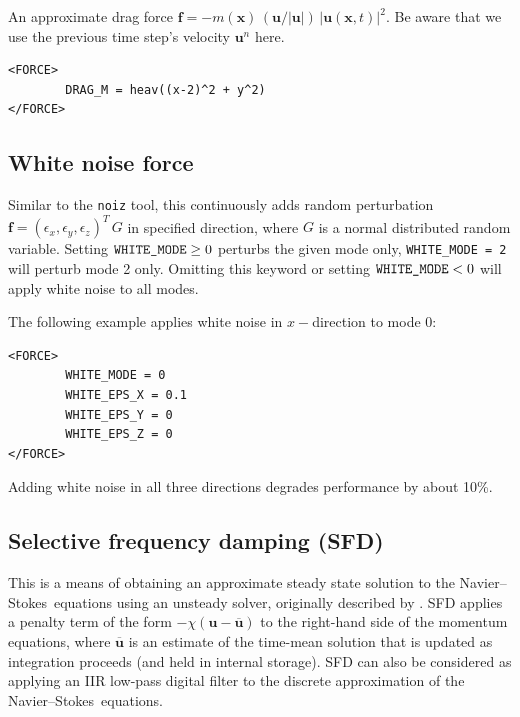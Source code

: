 \documentclass[11pt]{report}
\newcommand\NavSto{Navier--Stokes}
\begin{document}
An approximate drag force
$\bm{f} = - m(\bm{x}) \, (\bm{u}/|\bm{u}|)\, |\bm{u}(\bm{x},
t)|^2$.
Be aware that we use the previous time step's velocity $\bm{u}^{n}$ here.
\begin{verbatim}
<FORCE>
        DRAG_M = heav((x-2)^2 + y^2)
</FORCE>
\end{verbatim}

\subsection{White noise force}

Similar to the \verb+noiz+ tool, this continuously adds random
perturbation $\bm{f} = (\epsilon_x, \epsilon_y, \epsilon_z)^T\,G$ in
specified direction, where $G$ is a normal distributed random
variable. Setting $\verb+WHITE_MODE+ \ge 0$ perturbs the given mode
only, \ie \verb+WHITE_MODE = 2+ will perturb mode 2 only. Omitting
this keyword or setting $\verb+WHITE_MODE+ < 0$ will apply white noise
to all modes.

The following example applies white noise in $x-$direction to mode 0:
\begin{verbatim}
<FORCE>
        WHITE_MODE = 0
        WHITE_EPS_X = 0.1
        WHITE_EPS_Y = 0
        WHITE_EPS_Z = 0
</FORCE>
\end{verbatim}
Adding white noise in all three directions degrades performance by
about 10\%. 

\subsection{Selective frequency damping (SFD)}
\label{sec.sfd}

This is a means of obtaining an approximate steady state solution to
the \NavSto\ equations using an unsteady solver, originally described
by \citet{abhhms06}. SFD applies a penalty term of the form
$-\chi(\bm{u}-\overline{\bm{u}})$ to the right-hand side of the
momentum equations, where $\overline{\bm{u}}$ is an estimate of the
time-mean solution that is updated as integration proceeds (and held
in internal storage). SFD can also be considered as applying an IIR
low-pass digital filter to the discrete approximation of the
\NavSto\ equations.
\end{document}
